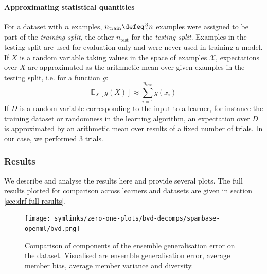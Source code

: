 \documentclass[../main.tex]{subfiles}
\begin{document}
\paragraph{Approximating statistical quantities} 
For a dataset with $n$ examples, $n_{\text{train}} \defeq \frac{3}{4}n$ examples were assigned to be part of the \textit{training split}, the other $n_{\text{test}}$ for the \textit{testing split}. Examples in the testing split are used for evaluation only and were never used in training a model.
If $X$ is a random variable taking values in the space of examples $\mathcal{X}$, expectations over $X$ are approximated as the arithmetic mean over given examples in the testing split, i.e. for a function $g$:
$$
\mathbb{E}_X \left[ g(X) \right]  \approx \sum_{i=1}^{n_\text{test}} g(x_i)
$$
If $D$ is a random variable corresponding to the input to a learner, for instance the training dataset or randomness in the learning algorithm, an expectation over $D$ is approximated by an arithmetic mean over results of a fixed number of trials. In our case, we performed $3$ trials. %

\subsubsection{Results}


We describe and analyse the results here and provide several plots. The full results plotted for comparison across learners and datasets are given in section \ref{sec:drf-full-results}.

\begin{figure}
    \texttt{[image: symlinks/zero-one-plots/bvd-decomps/spambase-openml/bvd.png]}
    \caption{
        Comparison of components of the ensemble generalisation error on the \spambase dataset. Visualised are ensemble generalisation error, average member bias, average member variance and diversity.
    }
    \label{fig:spambase-bvd}
\end{figure}



\end{document}
